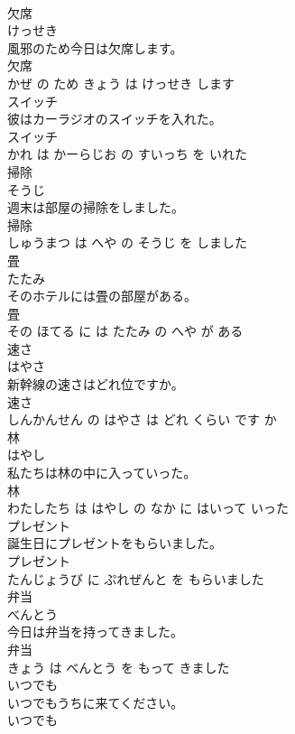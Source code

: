 \documentclass[8pt]{extreport}
\begin{document}
\begin{CJK}{UTF8}{min}
\\	欠席	
\\	けっせき			
\\	風邪のため今日は欠席します。	
\\	欠席 
\\	かぜ の ため きょう は けっせき します			
\\	スイッチ	
\\	彼はカーラジオのスイッチを入れた。	
\\	スイッチ 
\\	かれ は かーらじお の すいっち を いれた			
\\	掃除	
\\	そうじ			
\\	週末は部屋の掃除をしました。	
\\	掃除 
\\	しゅうまつ は へや の そうじ を しました			
\\	畳	
\\	たたみ			
\\	そのホテルには畳の部屋がある。	
\\	畳 
\\	その ほてる に は たたみ の へや が ある			
\\	速さ	
\\	はやさ			
\\	新幹線の速さはどれ位ですか。	
\\	速さ 
\\	しんかんせん の はやさ は どれ くらい です か			
\\	林	
\\	はやし			
\\	私たちは林の中に入っていった。	
\\	林 
\\	わたしたち は はやし の なか に はいって いった			
\\	プレゼント	
\\	誕生日にプレゼントをもらいました。	
\\	プレゼント 
\\	たんじょうび に ぷれぜんと を もらいました			
\\	弁当	
\\	べんとう			
\\	今日は弁当を持ってきました。	
\\	弁当 
\\	きょう は べんとう を もって きました			
\\	いつでも	
\\	いつでもうちに来てください。	
\\	いつでも 

\end{CJK}
\end{document}

